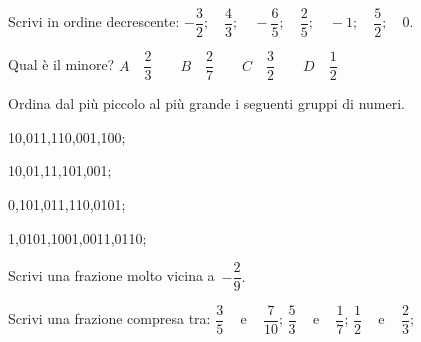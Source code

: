\begin{esercizio}
 \label{ese:3.33}
Scrivi in ordine decrescente:
% 
\(-\dfrac{3}{2}; \quad \dfrac{4}{3}; \quad -\dfrac{6}{5}; \quad 
\dfrac{2}{5}; \quad -1; \quad \dfrac{5}{2}; \quad 0.\)
\end{esercizio}

 \begin{esercizio}
\label{ese:3.34}
Qual è il minore? \qquad
\(\boxed{A} \quad \dfrac{2}{3} \quad \quad
  \boxed{B} \quad \dfrac{2}{7} \quad \quad
  \boxed{C} \quad \dfrac{3}{2} \quad \quad
  \boxed{D} \quad \dfrac{1}{2}\)
\end{esercizio}

\begin{esercizio}
 \label{ese:3.36}
Ordina dal più piccolo al più grande i seguenti gruppi di numeri.

\begin{htmulticols}{2}
\begin{enumeratees}
\item 10,011,110,001,100;
\item 10,01,11,101,001;
\item 0,101,011,110,0101;
\item 1,0101,1001,0011,0110;
\end{enumeratees}
\end{htmulticols}
\end{esercizio}

\begin{esercizio}
\label{ese:3.37}
Scrivi una frazione molto vicina a~\(-\dfrac{2}{9}.\)
\end{esercizio}

\begin{esercizio}
\label{ese:3.38}
Scrivi una frazione compresa tra:\qquad 
\(\dfrac{3}{5}\) ~ e ~ \(\dfrac{7}{10}\); \qquad 
\(\dfrac{5}{3}\) ~ e ~ \(\dfrac{1}{7}\); \qquad 
\(\dfrac{1}{2}\) ~ e ~ \(\dfrac{2}{3}\);
\end{esercizio}

